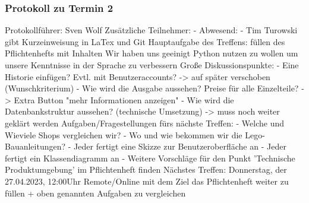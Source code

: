 \subsubsection{Protokoll zu Termin 2}
Protokollführer: Sven Wolf \newline
Zusätzliche Teilnehmer: - \newline
Abwesend: - \newline \newline
Tim Turowski gibt Kurzeinweisung in LaTex und Git \newline
Hauptaufgabe des Treffens: füllen des Pflichtenhefts mit Inhalten \newline
Wir haben uns geeinigt Python nutzen zu wollen um unsere Kenntnisse in der Sprache zu verbessern \newline
Große Diskussionspunkte: \newline
- Eine Historie einfügen? Evtl. mit Benutzeraccounts? -> auf später verschoben (Wunschkriterium) \newline
- Wie wird die Ausgabe aussehen? Preise für alle Einzelteile? -> Extra Button "mehr Informationen anzeigen" \newline
- Wie wird die Datenbankstruktur aussehen? (technische Umsetzung) -> muss noch weiter geklärt werden \newline
Aufgaben/Fragestellungen fürs nächste Treffen: \newline
- Welche und Wieviele Shops vergleichen wir? \newline
- Wo und wie bekommen wir die Lego-Bauanleitungen? \newline
- Jeder fertigt eine Skizze zur Benutzeroberfläche an \newline
- Jeder fertigt ein Klassendiagramm an \newline
- Weitere Vorschläge für den Punkt 'Technische Produktumgebung' im Pflichtenheft finden \newline
Nächstes Treffen: Donnerstag, der 27.04.2023, 12:00Uhr Remote/Online mit dem Ziel das Pflichtenheft weiter zu füllen + oben genannten Aufgaben zu vergleichen

